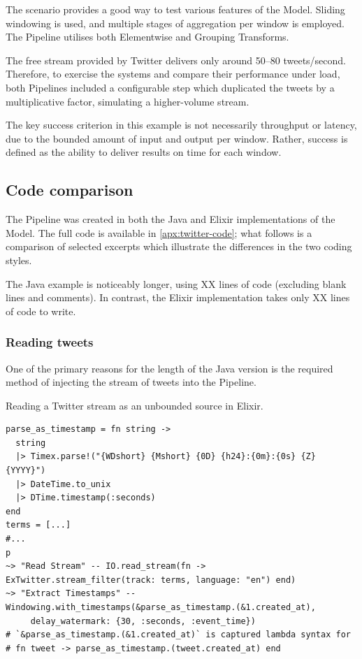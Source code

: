 The scenario provides a good way to test various features of the Model.
Sliding windowing is used, and multiple stages of aggregation per window is employed.
The Pipeline utilises both Elementwise and Grouping Transforms.

The free stream provided by Twitter delivers only around 50--80 tweets/second.
Therefore, to exercise the systems and compare their performance under load, both Pipelines included a configurable step which duplicated the tweets by a multiplicative factor, simulating a higher-volume stream.

The key success criterion in this example is not necessarily throughput or latency, due to the bounded amount of input and output per window.
Rather, success is defined as the ability to deliver results on time for each window.

\subsection{Code comparison}\label{sec:eval:twitter:code}

The Pipeline was created in both the Java and Elixir implementations of the Model.
The full code is available in \cref{apx:twitter-code}; what follows is a comparison of selected excerpts which illustrate the differences in the two coding styles.

The Java example is noticeably longer, using XX lines of code (excluding blank lines and comments).
In contrast, the Elixir implementation takes only XX lines of code to write.

\subsubsection{Reading tweets}

One of the primary reasons for the length of the Java version is the required method of injecting the stream of tweets into the Pipeline.

\begin{codelisting}
	\caption{Reading a Twitter stream as an unbounded source in Elixir.}
	\label{lst:eval:twitter-readstream-elixir}
	\begin{verbatim}
parse_as_timestamp = fn string ->
  string
  |> Timex.parse!("{WDshort} {Mshort} {0D} {h24}:{0m}:{0s} {Z} {YYYY}")
  |> DateTime.to_unix
  |> DTime.timestamp(:seconds)
end
terms = [...]
#...
p
~> "Read Stream" -- IO.read_stream(fn -> ExTwitter.stream_filter(track: terms, language: "en") end)
~> "Extract Timestamps" -- Windowing.with_timestamps(&parse_as_timestamp.(&1.created_at),
     delay_watermark: {30, :seconds, :event_time})
# `&parse_as_timestamp.(&1.created_at)` is captured lambda syntax for
# fn tweet -> parse_as_timestamp.(tweet.created_at) end
	\end{verbatim}
\end{codelisting}

